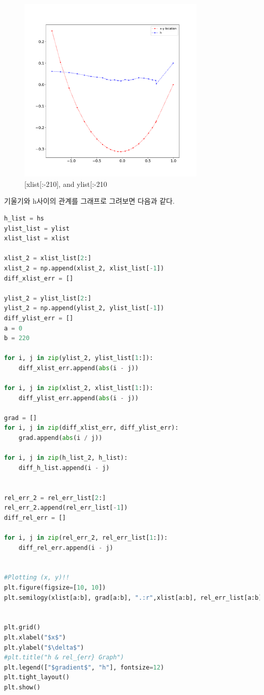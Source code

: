 \documentclass[11pt]{article}
\begin{document}
\begin{figure}[!ht]
  \centering
  \includegraphics[width=0.8\textwidth]{xandhs4.pdf}
  \caption{[xlist[:-210], and ylist[:-210}
\end{figure} 

기울기와 h사이의 관계를 그래프로 그려보면 다음과 같다.
\begin{lstlisting}[language=Python]
h_list = hs 
ylist_list = ylist 
xlist_list = xlist

xlist_2 = xlist_list[2:] 
xlist_2 = np.append(xlist_2, xlist_list[-1]) 
diff_xlist_err = []

ylist_2 = ylist_list[2:] 
ylist_2 = np.append(ylist_2, ylist_list[-1]) 
diff_ylist_err = []
a = 0
b = 220

for i, j in zip(ylist_2, ylist_list[1:]):
    diff_xlist_err.append(abs(i - j))

for i, j in zip(xlist_2, xlist_list[1:]):
    diff_ylist_err.append(abs(i - j))

grad = []
for i, j in zip(diff_xlist_err, diff_ylist_err):
    grad.append(abs(i / j))
    
for i, j in zip(h_list_2, h_list):
    diff_h_list.append(i - j)
    

rel_err_2 = rel_err_list[2:] 
rel_err_2.append(rel_err_list[-1]) 
diff_rel_err = []

for i, j in zip(rel_err_2, rel_err_list[1:]):
    diff_rel_err.append(i - j)

    
#Plotting (x, y)!!
plt.figure(figsize=[10, 10])
plt.semilogy(xlist[a:b], grad[a:b], ".:r",xlist[a:b], rel_err_list[a:b], ".:b")


plt.grid()
plt.xlabel("$x$")
plt.ylabel("$\delta$")
#plt.title("h & rel_{err} Graph")
plt.legend(["$gradient$", "h"], fontsize=12)
plt.tight_layout()
plt.show()
\end{lstlisting}
\end{document}
